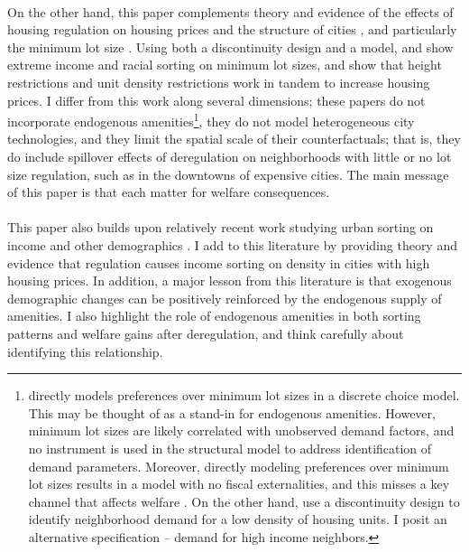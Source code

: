 \documentclass[]{article}
\begin{document}
	\paragraph*{}
	On the other hand, this paper complements theory and evidence of the effects of housing regulation on housing prices and the structure of cities \citep{MolloyRSUE, gyourkomolloy, turner2014, glaesergyourko2018, bruecknersingh, anagoletal2021, bbheight, mills2005, HILBER2013, op2014}, and particularly the minimum lot size \citep{zabel, Song, kulka, KSC, griesonwhite, WHITE1975}. Using both a discontinuity design and a model, \cite{Song} and \cite{kulka} show extreme income and racial sorting on minimum lot sizes, and \cite{KSC} show that height restrictions and unit density restrictions work in tandem to increase housing prices. I differ from this work along several dimensions; these papers do not incorporate endogenous amenities\footnote{\cite{Song} directly models preferences over minimum lot sizes in a discrete choice model. This may be thought of as a stand-in for endogenous amenities. However, minimum lot sizes are likely correlated with unobserved demand factors, and no instrument is used in the structural model to address identification of demand parameters. Moreover, directly modeling preferences over minimum lot sizes results in a model with no fiscal externalities, and this misses a key channel that affects welfare \citep{hamilton1976, calabresetal}. On the other hand, \cite{KSC} use a discontinuity design to identify neighborhood demand for a low density of housing units. I posit an alternative specification -- demand for high income neighbors.}, they do not model heterogeneous city technologies, and they limit the spatial scale of their counterfactuals; that is, they do include spillover effects of deregulation on neighborhoods with little or no lot size regulation, such as in the downtowns of expensive cities. The main message of this paper is that each matter for welfare consequences. 
	
	\paragraph*{}
	This paper also builds upon relatively recent work studying urban sorting on income and other demographics \citep{diamond2016, bshartley2020, couturehandbury, Coutureetal, superstarcities, su2021, citysizewagegap, Gentrificationcycles, FogliGuerrieri, ccpoortransport, parispoor}. I add to this literature by providing theory and evidence that regulation causes income sorting on density in cities with high housing prices. In addition, a major lesson from this literature is that exogenous demographic changes can be positively reinforced by the endogenous supply of amenities. I also highlight the role of endogenous amenities in both sorting patterns and welfare gains after deregulation, and think carefully about identifying this relationship.
	
\end{document}
